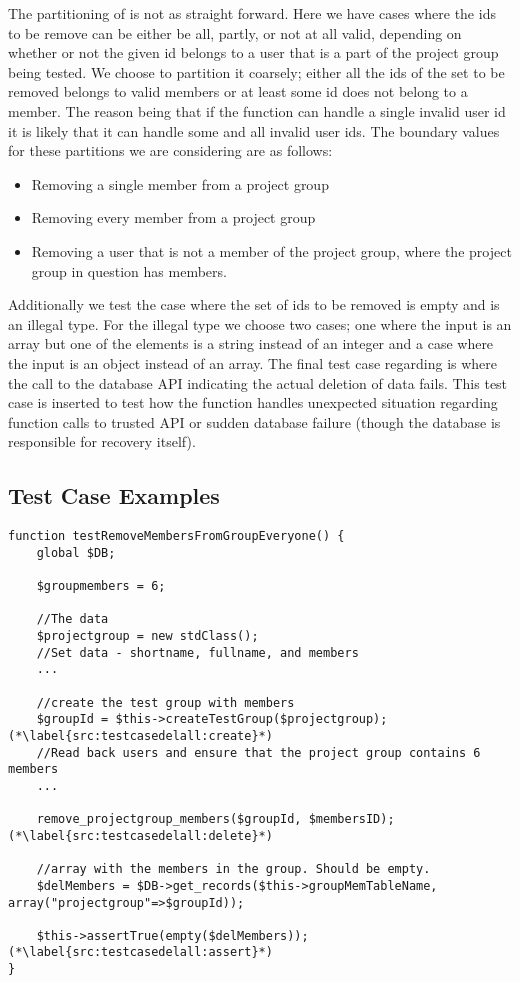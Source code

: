 The partitioning of \varuserids{} is not as straight forward.
Here we have cases where the ids to be remove can be either be all, partly, or not at all valid, depending on whether or not the given id belongs to a user that is a part of the project group being tested.
We choose to partition it coarsely; either all the ids of the set to be removed belongs to valid members or at least some id does not belong to a member.
The reason being that if the function can handle a single invalid user id it is likely that it can handle some and all invalid user ids.
The boundary values for these partitions we are considering are as follows: 
\begin{itemize}
	\item Removing a single member from a project group
	\item Removing every member from a project group
	\item Removing a user that is not a member of the project group, where the project group in question has members.
\end{itemize}
Additionally we test the case where the set of ids to be removed is empty and is an illegal type.
For the illegal type we choose two cases; one where the input is an array but one of the elements is a string instead of an integer and a case where the input is an object instead of an array.
The final test case regarding \varuserids{} is where the call to the database API indicating the actual deletion of data fails.
This test case is inserted to test how the function handles unexpected situation regarding function calls to trusted API or sudden database failure (though the database is responsible for recovery itself).

\subsection{Test Case Examples}
\label{sub:testCaseEg}
\begin{lstlisting}[style=phpCode, caption=\myCaption{A test case for the function \fu{remove\_projectgroup\_members}. The test case tests if the function correctly removes all the members of the project group when instructed to.}, label=src:testcasedelall]
function testRemoveMembersFromGroupEveryone() {
	global $DB;
	
	$groupmembers = 6;
	
	//The data
	$projectgroup = new stdClass(); 
	//Set data - shortname, fullname, and members
	...
	
	//create the test group with members
	$groupId = $this->createTestGroup($projectgroup); (*\label{src:testcasedelall:create}*)
	//Read back users and ensure that the project group contains 6 members
	...
	
	remove_projectgroup_members($groupId, $membersID); (*\label{src:testcasedelall:delete}*)
	
	//array with the members in the group. Should be empty.
	$delMembers = $DB->get_records($this->groupMemTableName, array("projectgroup"=>$groupId));
	
	$this->assertTrue(empty($delMembers)); (*\label{src:testcasedelall:assert}*)
}
\end{lstlisting}

